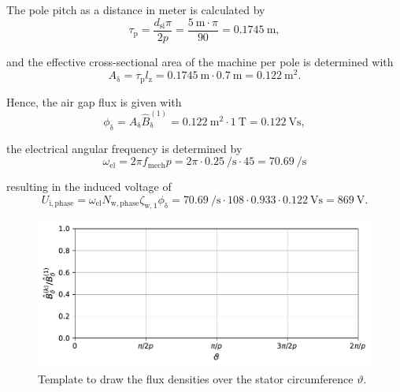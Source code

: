 \begin{solutionblock}
    The pole pitch as a distance in meter is calculated by
    $$ \tau_{\mathrm{p}} = \frac{d_{\mathrm{si}} \pi}{2p} = \frac{\SI{5}{\metre}\cdot \pi}{90} = \SI{0.1745}{\metre},$$

    and the effective cross-sectional area of the machine per pole is determined with
    $$ A_{\updelta} = \tau_{\mathrm{p}} l_{\mathrm{z}} = \SI{0.1745}{\metre} \cdot \SI{0.7}{\metre}
    = \SI{0.122}{\metre^2}.$$

    Hence, the air gap flux is given with
    $$ \phi_{\updelta} = A_{\updelta} \hat{B}_{\updelta}^{(1)} = \SI{0.122}{\metre^2} \cdot \SI{1}{\tesla} = \SI{0.122}{\volt\second},$$

    the electrical angular frequency is determined by
    $$ \omega_{\mathrm{el}} = 2 \pi f_{\mathrm{mech}} p = 2 \pi \cdot \SI{0.25}{\per\second} \cdot 45 = \SI{70.69}{\per\second}$$

    resulting in the induced voltage of 
    $$ U_{\mathrm{i,phase}} = \omega_{\mathrm{el}} N_{\mathrm{w,phase}} \zeta_{\mathrm{w,}1} \phi_{\updelta} = \SI{70.69}{\per\second} \cdot 108 \cdot 0.933 \cdot \SI{0.122}{\volt\second} = \SI{869}{\volt}. $$
    
\end{solutionblock}





\begin{figure}[ht!]
    \centering
    \includegraphics{fig/B_sketch_fund.pdf}
    \caption{Template to draw the flux densities over the stator circumference $\vartheta$.}
    \label{fig:B_sketch_fund}
\end{figure}%

